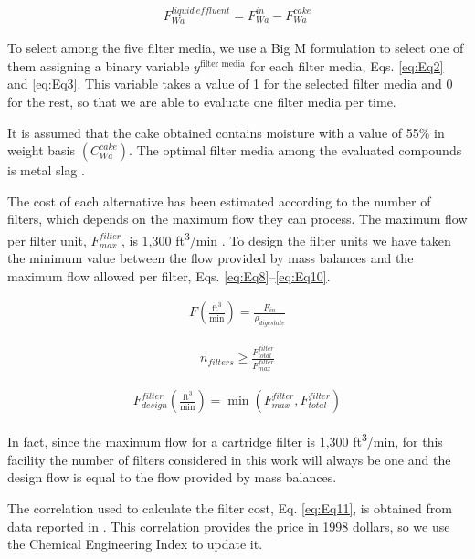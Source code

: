 \begin{refsection}[referencesCh2]
\begin{align}
	F_{Wa}^{{{liquid \ effluent}}} = F_{Wa}^{{in}} - F_{Wa}^{{cake}} \label{eq:Eq7}
\end{align}

To select among the five filter media, we use a Big M formulation to select one of them assigning a binary variable $y^{\text{filter media}}$ for each filter media, Eqs. \ref{eq:Eq2} and \ref{eq:Eq3}. This variable takes a value of 1 for the selected filter media and 0 for the rest, so that we are able to evaluate one filter media per time.

It is assumed that the cake obtained contains moisture with a value of 55\% in weight basis $\left(C_{Wa}^{cake}\right)$. The optimal filter media among the evaluated compounds is metal slag \citep{li2015study}.

The cost of each alternative has been estimated according to the number of filters, which depends on the maximum flow they can process. The maximum flow per filter unit, $F_{max}^{{filter}}$, is 1,300 ft\textsuperscript{3}/min \citep{loh2002process}. To design the filter units we have taken the minimum value between the flow provided by mass balances and the maximum flow allowed per filter, Eqs. \ref{eq:Eq8}–\ref{eq:Eq10}.

\begin{align}
	F\left( {\frac{\text{ft}^3}{\text{min}}} \right) = \frac{{{F_{in}}}}{{{\rho _{{digestate}}}}} \label{eq:Eq8}
\end{align}

\begin{align}
	{n}_{{filters}} \ge \frac{F_{total}^{{filter}}}{F_{{max}}^{{filter}}} 	\label{eq:Eq9}
\end{align}

\begin{align}
	F_{design}^{{filter}}\left( {\frac{\text{ft}^3}{\text{min}}} \right) = \min \left( {F_{max}^{{filter}},F_{total}^{{filter}}} \right) \label{eq:Eq10}
\end{align}

In fact, since the maximum flow for a cartridge filter is 1,300 ft\textsuperscript{3}/min, for this facility the number of filters considered in this work will always be one and the design flow is equal to the flow provided by mass balances.

The correlation used to calculate the filter cost, Eq. \ref{eq:Eq11}, is obtained from data reported in \citet{loh2002process}. This correlation provides the price in 1998 dollars, so we use the Chemical Engineering Index to update it.


\end{refsection}
